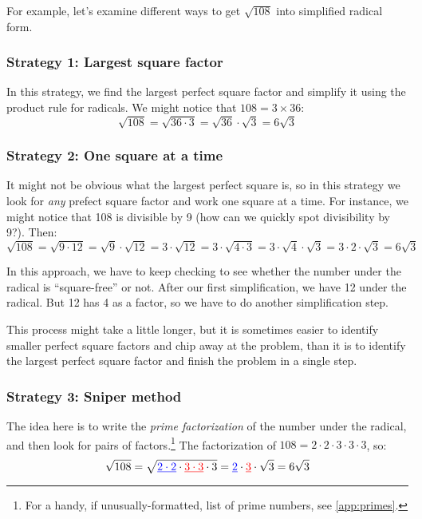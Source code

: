 For example, let's examine different ways to get $\sqrt{108}$ into simplified radical form.

\subsubsection{Strategy 1: Largest square factor}

In this strategy, we find the largest perfect square factor and simplify it using the product rule for radicals. We might notice that $108 = 3 \times 36$: \[\sqrt{108} = \sqrt{36 \cdot 3} = \sqrt{36} \cdot \sqrt{3} = 6\sqrt{3}\]

\subsubsection{Strategy 2: One square at a time}

It might not be obvious what the largest perfect square is, so in this strategy we look for \textit{any} prefect square factor and work one square at a time. For instance, we might notice that 108 is divisible by 9 (how can we quickly spot divisibility by 9?). Then: \[\sqrt{108} = \sqrt{9 \cdot 12} = \sqrt{9} \cdot \sqrt{12} = 3 \cdot \sqrt{12} = 3 \cdot \sqrt{4 \cdot 3} = 3 \cdot \sqrt{4} \cdot \sqrt{3} = 3 \cdot 2 \cdot \sqrt{3} = 6\sqrt{3}\]

In this approach, we have to keep checking to see whether the number under the radical is ``square-free'' or not. After our first simplification, we have 12 under the radical. But 12 has 4 as a factor, so we have to do another simplification step.

This process might take a little longer, but it is sometimes easier to identify smaller perfect square factors and chip away at the problem, than it is to identify the largest perfect square factor and finish the problem in a single step.

\subsubsection{Strategy 3: Sniper method}

The idea here is to write the \textit{prime factorization} of the number under the radical, and then look for pairs of factors.\footnote{For a handy, if unusually-formatted, list of prime numbers, see \cref{app:primes}.} The factorization of $108 = 2 \cdot 2 \cdot 3 \cdot 3 \cdot 3$, so: \[\sqrt{108} = \sqrt{\underline{\color{blue}2 \cdot 2} \cdot \underline{\color{red}3 \cdot 3} \cdot 3} = \underline{\color{blue}2} \cdot \underline{\color{red}3} \cdot \sqrt{3} = 6\sqrt{3} \]

